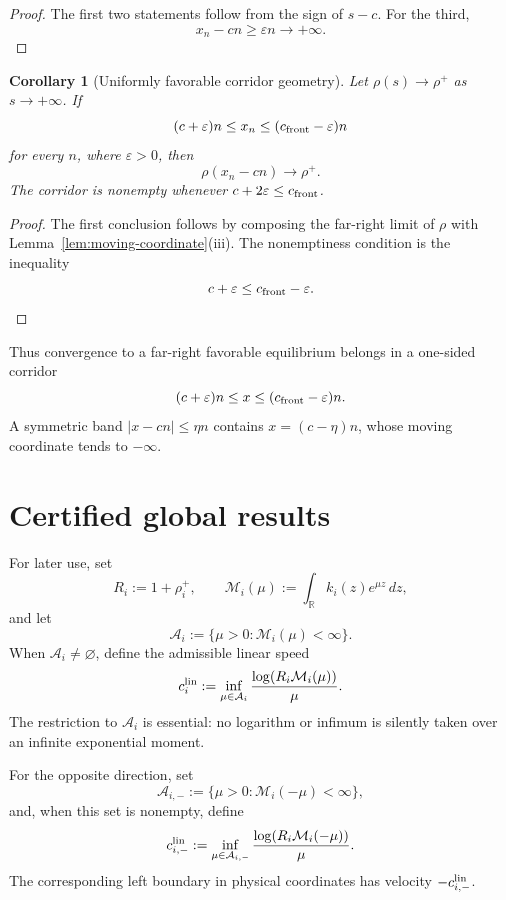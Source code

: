 \documentclass[11pt]{article}
\newtheorem{corollary}[theorem]{Corollary}
\theoremstyle{definition}
\newcommand{\R}{\mathbb R}
\newcommand{\M}{\mathcal M}
\begin{document}
\begin{proof}
The first two statements follow from the sign of \(s-c\).  For the third,
\[
  x_n-cn\geq\varepsilon n\longrightarrow+\infty.
\]
\end{proof}

\begin{corollary}[Uniformly favorable corridor geometry]
\label{cor:favorable-corridor}
Let \(\rho(s)\to\rho^+\) as \(s\to+\infty\).  If
\[
  (c+\varepsilon)n\leq x_n
  \leq(c_{\rm front}-\varepsilon)n
\]
for every \(n\), where \(\varepsilon>0\), then
\[
  \rho(x_n-cn)\longrightarrow\rho^+.
\]
The corridor is nonempty whenever \(c+2\varepsilon\leq c_{\rm front}\).
\end{corollary}

\begin{proof}
The first conclusion follows by composing the far-right limit of \(\rho\)
with Lemma~\ref{lem:moving-coordinate}(iii).  The nonemptiness condition is
the inequality
\[
  c+\varepsilon\leq c_{\rm front}-\varepsilon.
\]
\end{proof}

Thus convergence to a far-right favorable equilibrium belongs in a
one-sided corridor
\[
  (c+\varepsilon)n
  \leq x
  \leq(c_{\rm front}-\varepsilon)n.
\]
A symmetric band \(|x-cn|\leq\eta n\) contains
\(x=(c-\eta)n\), whose moving coordinate tends to \(-\infty\).

\section{Certified global results}
\label{sec:global-results}

For later use, set
\[
  R_i:=1+\rho_i^+,
  \qquad
  \M_i(\mu):=\int_{\R}k_i(z)e^{\mu z}\,dz,
\]
and let
\[
  \mathcal A_i
  :=
  \{\mu>0:\M_i(\mu)<\infty\}.
\]
When \(\mathcal A_i\neq\varnothing\), define the admissible linear speed
\begin{equation}\label{eq:admissible-linear-speeds}
  c_i^{\rm lin}
  :=
  \inf_{\mu\in\mathcal A_i}
  \frac{\log(R_i\M_i(\mu))}{\mu}.
\end{equation}
The restriction to \(\mathcal A_i\) is essential: no logarithm or infimum is
silently taken over an infinite exponential moment.

For the opposite direction, set
\[
  \mathcal A_{i,-}
  :=
  \{\mu>0:\M_i(-\mu)<\infty\},
\]
and, when this set is nonempty, define
\begin{equation}\label{eq:admissible-left-speeds}
  c_{i,-}^{\rm lin}
  :=
  \inf_{\mu\in\mathcal A_{i,-}}
  \frac{\log(R_i\M_i(-\mu))}{\mu}.
\end{equation}
The corresponding left boundary in physical coordinates has velocity
\(-c_{i,-}^{\rm lin}\).
\end{document}
